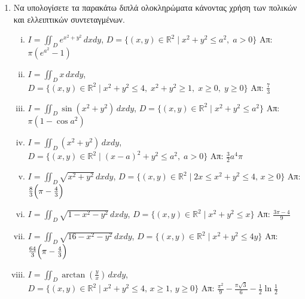 



\pagestyle{askhseis}
\everymath{\displaystyle}



\begin{center}
  \minibox[c]{\large\bf \textcolor{Col1}{Ασκήσεις Διπλό Ολοκλήρωμα} \\
  \textcolor{Col1}{(Αλλαγή Μεταβλητών)}}
\end{center}

\vspace{\baselineskip}

\begin{enumerate}
  \item Να υπολογίσετε τα παρακάτω διπλά ολοκληρώματα κάνοντας χρήση των πολικών 
    και ελλειπτικών συντεταγμένων.
    \begin{enumerate}[i)]
      \item $I=\iint_{D}e^{x^2+y^2}\,dxdy$, 
        \quad $D=\{(x,y)\in\mathbb{R}^2 \mid x^2+y^2\leq a^2,\; a>0\}$ 
        \hfill Απ: $\pi(e^{a^2}-1)$ %
      \item $I=\iint_{D}x\,dxdy$, \quad $ D= \{(x,y)\in \mathbb{R}^{2} \mid x^{2}+y^{2} 
        \leq 4,\; x^{2}+y^{2} \geq 1,\; x \geq 0,\; y \geq 0 \} $ 
        \hfill Απ: $ \frac{7}{3} $ %
      \item $I=\iint_{D}\sin(x^2+y^2)\,dxdy$, \quad $D= \{(x,y)\in \mathbb{R}^{2} 
        \mid x^{2}+y^{2} \leq a^{2} \}$ 
        \hfill Απ: $\pi (1 - \cos{a^{2}}) $
      \item $I=\iint_{D}(x^2+y^2)\,dxdy$, \quad $ D= \{(x,y)\in \mathbb{R}^{2} 
        \mid (x-a)^{2}+y^{2} \leq a^{2},\; a>0 \}  $ 
        \hfill Απ: $\frac{3}{2}a^4\pi$
      \item $I=\iint_{D}\sqrt{x^2+y^2}\,dxdy$, \quad $ D= \{(x,y)\in \mathbb{R}^{2} 
        \mid 2x \leq x^{2}+y^{2} \leq 4,\, x \geq 0  \} $ 
        \hfill Απ: $\frac{8}{3}\Bigl(\pi-\frac{4}{3}\Bigr)$
      \item $ I=\iint_{D} \sqrt{ 1-x^{2}-y^{2} } \,dxdy $, 
        \quad $ D= \{(x,y)\in \mathbb{R}^{2} \mid x^{2}+y^{2} \leq x\} $ 
        \hfill Απ:  $ \frac{3\pi -4}{9} $ %
      \item $ I=\iint_{D} \sqrt{ 16-x^{2}-y^{2}}\,dxdy  $, \quad $ D= \{(x,y)\in
        \mathbb{R}^{2} \mid x^{2}+y^{2} \leq 4y \} $ \hfill Απ: $ \frac{64}{3} 
        \Bigl(\pi - \frac{4}{3}\Bigr) $  
      \item $ I=\iint_{D} \arctan(\frac{y}{x})\,dxdy $, 
        \quad $ D= \{(x,y)\in \mathbb{R}^{2} \mid x^{2}+y^{2} \leq 4,\, x \geq 1,\, y 
        \geq 0 \} $ 
        \hfill Απ: $ \frac{\pi ^{2}}{9} - \frac{\pi \sqrt{3}}{6} - 
        \frac{1}{2} \ln{\frac{1}{2} } $ %
    \end{enumerate}


\end{enumerate}
